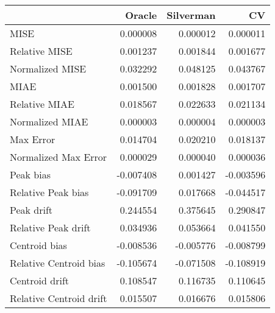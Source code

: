 \begin{tabular}{lrrr}
  \hline
 & Oracle & Silverman & CV \\ 
  \hline
MISE & 0.000008 & 0.000012 & 0.000011 \\ 
  Relative MISE & 0.001237 & 0.001844 & 0.001677 \\ 
  Normalized MISE & 0.032292 & 0.048125 & 0.043767 \\ 
  MIAE & 0.001500 & 0.001828 & 0.001707 \\ 
  Relative MIAE & 0.018567 & 0.022633 & 0.021134 \\ 
  Normalized MIAE & 0.000003 & 0.000004 & 0.000003 \\ 
  Max Error & 0.014704 & 0.020210 & 0.018137 \\ 
  Normalized Max Error & 0.000029 & 0.000040 & 0.000036 \\ 
  Peak bias & -0.007408 & 0.001427 & -0.003596 \\ 
  Relative Peak bias & -0.091709 & 0.017668 & -0.044517 \\ 
  Peak drift & 0.244554 & 0.375645 & 0.290847 \\ 
  Relative Peak drift & 0.034936 & 0.053664 & 0.041550 \\ 
  Centroid bias & -0.008536 & -0.005776 & -0.008799 \\ 
  Relative Centroid bias & -0.105674 & -0.071508 & -0.108919 \\ 
  Centroid drift & 0.108547 & 0.116735 & 0.110645 \\ 
  Relative Centroid drift & 0.015507 & 0.016676 & 0.015806 \\ 
   \hline
\end{tabular}
